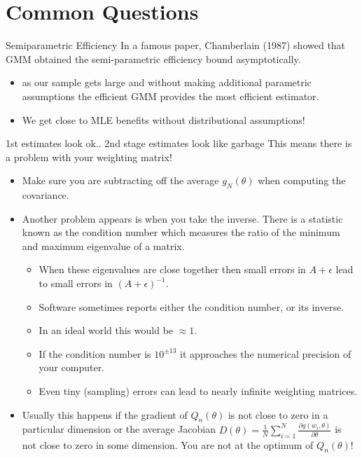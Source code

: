 \documentclass[aspectratio=169]{beamer}
\begin{document}
\section*{\normalsize  Common Questions}
\begin{frame}{Semiparametric Efficiency}
In a famous paper, Chamberlain (1987) showed that GMM obtained the \alert{semi-parametric efficiency bound} asymptotically. 
\begin{itemize}
\item  as our sample gets large and without making additional parametric assumptions the efficient GMM provides the most efficient estimator.
\item We get close to MLE benefits without distributional assumptions!
\end{itemize}
\end{frame}



\begin{frame}{1st estimates look ok.. 2nd stage estimates look like garbage}
\footnotesize
This means there is a  \alert{problem with your weighting matrix}!
\begin{itemize}
\item Make sure you are subtracting off the average $g_N(\theta)$ when computing the covariance. 
\item Another problem appears is when you take the inverse. There is a statistic known as the \alert{condition number} which measures the ratio of the minimum and maximum eigenvalue of a matrix. 
\begin{itemize}
\item When these eigenvalues are close together then small errors in $A+\epsilon$ lead to small errors in $(A+\epsilon)^{-1}$. 
\item Software sometimes reports either the condition number, or its inverse. 
\item In an ideal world this would be $\approx 1$. 
\item If the condition number is $10^{\pm 13}$ it approaches the numerical precision of your computer. 
\item Even tiny (sampling) errors can lead to nearly infinite weighting matrices. 
\end{itemize}
\item Usually this happens if the gradient of $Q_n(\theta)$ is not close to zero in a particular dimension or the average Jacobian $D(\theta)=\frac{1}{N} \sum_{i=1}^N \frac{\partial g(w_i,\theta)}{\partial \theta}$ is not close to zero in some dimension. You are not at the optimum of $Q_n(\theta)$!
\end{itemize}
\end{frame}
\end{document}
